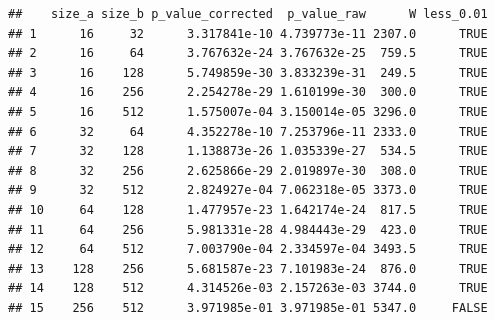 \documentclass[]{book}
\begin{document}
\begin{verbatim}
##    size_a size_b p_value_corrected  p_value_raw      W less_0.01
## 1      16     32      3.317841e-10 4.739773e-11 2307.0      TRUE
## 2      16     64      3.767632e-24 3.767632e-25  759.5      TRUE
## 3      16    128      5.749859e-30 3.833239e-31  249.5      TRUE
## 4      16    256      2.254278e-29 1.610199e-30  300.0      TRUE
## 5      16    512      1.575007e-04 3.150014e-05 3296.0      TRUE
## 6      32     64      4.352278e-10 7.253796e-11 2333.0      TRUE
## 7      32    128      1.138873e-26 1.035339e-27  534.5      TRUE
## 8      32    256      2.625866e-29 2.019897e-30  308.0      TRUE
## 9      32    512      2.824927e-04 7.062318e-05 3373.0      TRUE
## 10     64    128      1.477957e-23 1.642174e-24  817.5      TRUE
## 11     64    256      5.981331e-28 4.984443e-29  423.0      TRUE
## 12     64    512      7.003790e-04 2.334597e-04 3493.5      TRUE
## 13    128    256      5.681587e-23 7.101983e-24  876.0      TRUE
## 14    128    512      4.314526e-03 2.157263e-03 3744.0      TRUE
## 15    256    512      3.971985e-01 3.971985e-01 5347.0     FALSE
\end{verbatim}
\end{document}
